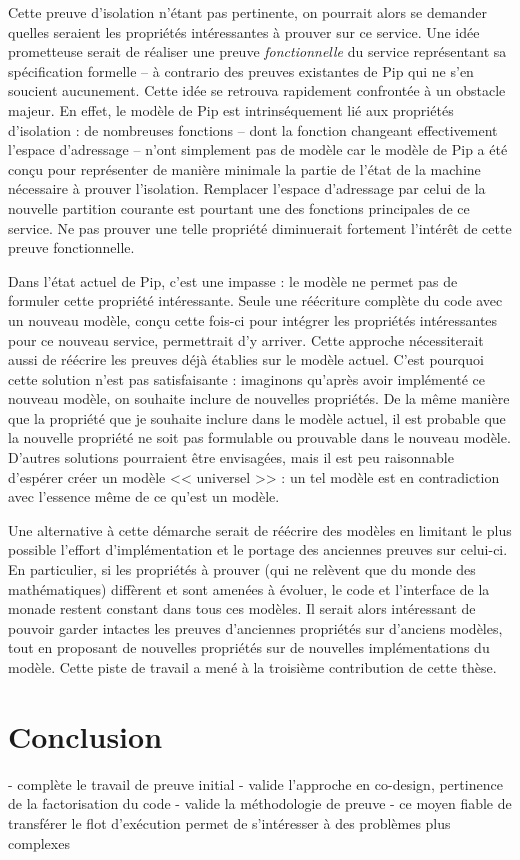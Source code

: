 		Cette preuve d'isolation n'étant pas pertinente, on pourrait alors se demander quelles seraient les propriétés intéressantes à prouver sur ce service. Une idée prometteuse serait de réaliser une preuve \emph{fonctionnelle} du service représentant sa spécification formelle -- à contrario des preuves existantes de Pip qui ne s'en soucient aucunement. Cette idée se retrouva rapidement confrontée à un obstacle majeur. En effet, le modèle de Pip est intrinséquement lié aux propriétés d'isolation : de nombreuses fonctions -- dont la fonction changeant effectivement l'espace d'adressage -- n'ont simplement pas de modèle car le modèle de Pip a été conçu pour représenter de manière minimale la partie de l'état de la machine nécessaire à prouver l'isolation. Remplacer l'espace d'adressage par celui de la nouvelle partition courante est pourtant une des fonctions principales de ce service. Ne pas prouver une telle propriété diminuerait fortement l'intérêt de cette preuve fonctionnelle.

		Dans l'état actuel de Pip, c'est une impasse : le modèle ne permet pas de formuler cette propriété intéressante. Seule une réécriture complète du code avec un nouveau modèle, conçu cette fois-ci pour intégrer les propriétés intéressantes pour ce nouveau service, permettrait d'y arriver. Cette approche nécessiterait aussi de réécrire les preuves déjà établies sur le modèle actuel.
		C'est pourquoi cette solution n'est pas satisfaisante : imaginons qu'après avoir implémenté ce nouveau modèle, on souhaite inclure de nouvelles propriétés. De la même manière que la propriété que je souhaite inclure dans le modèle actuel, il est probable que la nouvelle propriété ne soit pas formulable ou prouvable dans le nouveau modèle. D'autres solutions pourraient être envisagées, mais il est peu raisonnable d'espérer créer un modèle << universel >> : un tel modèle est en contradiction avec l'essence même de ce qu'est un modèle.

		Une alternative à cette démarche serait de réécrire des modèles en limitant le plus possible l'effort d'implémentation et le portage des anciennes preuves sur celui-ci. En particulier, si les propriétés à prouver (qui ne relèvent que du monde des mathématiques) diffèrent et sont amenées à évoluer, le code et l'interface de la monade restent constant dans tous ces modèles. Il serait alors intéressant de pouvoir garder intactes les preuves d'anciennes propriétés sur d'anciens modèles, tout en proposant de nouvelles propriétés sur de nouvelles implémentations du modèle. Cette piste de travail a mené à la troisième contribution de cette thèse.

	\section{Conclusion}
	- complète le travail de preuve initial
	- valide l'approche en co-design, pertinence de la factorisation du code
	- valide la méthodologie de preuve
	- ce moyen fiable de transférer le flot d'exécution permet de s'intéresser à des problèmes plus complexes
